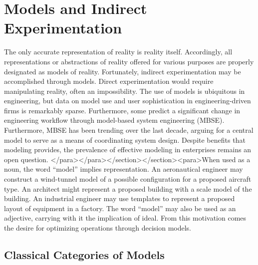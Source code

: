 \section{Models and Indirect Experimentation}

The only accurate representation of reality is reality itself. Accordingly, all representations or abstractions of reality offered for various purposes are properly designated as models of reality. Fortunately, indirect experimentation may be accomplished through models. Direct experimentation would require manipulating reality, often an impossibility.
The use of models is ubiquitous in engineering, but data on model use and user sophistication in engineering-driven firms is remarkably sparse. Furthermore, some predict a significant change in engineering workflow through model-based system engineering (MBSE). Furthermore, MBSE has been trending over the last decade, arguing for a central model to serve as a means of coordinating system design. Despite benefits that modeling provides, the prevalence of effective modeling in enterprises remains an open question.
</para></para></section></section><para>When used as a noun, the word “model” implies representation. An aeronautical engineer may construct a wind-tunnel model of a possible configuration for a proposed aircraft type. An architect might represent a proposed building with a scale model of the building. An industrial engineer may use templates to represent a proposed layout of equipment in a factory. The word “model” may also be used as an adjective, carrying with it the implication of ideal. From this motivation comes the desire for optimizing operations through decision models.

\subsection{Classical Categories of Models}

